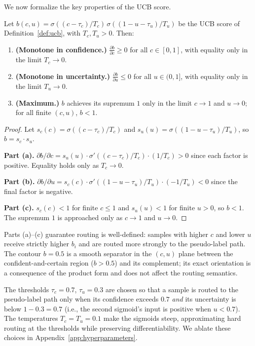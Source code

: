 We now formalize the key properties of the UCB score.

\begin{theorem}
\label{thm:ucb}
Let $b(c,u) = \sigma((c-\tau_c)/T_c)\,\sigma((1-u-\tau_u)/T_u)$ be the UCB score of Definition~\ref{def:ucb}, with $T_c, T_u > 0$. Then:
\begin{enumerate}[label=(\alph*),leftmargin=*,topsep=2pt,itemsep=2pt]
  \item \textbf{(Monotone in confidence.)} $\frac{\partial b}{\partial c} \ge 0$ for all $c \in [0,1]$, with equality only in the limit $T_c \to 0$.
  \item \textbf{(Monotone in uncertainty.)} $\frac{\partial b}{\partial u} \le 0$ for all $u \in (0,1]$, with equality only in the limit $T_u \to 0$.
  \item \textbf{(Maximum.)} $b$ achieves its supremum $1$ only in the limit $c \to 1$ and $u \to 0$; for all finite $(c,u)$, $b < 1$.
\end{enumerate}
\end{theorem}

\begin{proof}
Let $s_c(c) = \sigma((c-\tau_c)/T_c)$ and $s_u(u) = \sigma((1-u-\tau_u)/T_u)$, so $b = s_c \cdot s_u$.

\textbf{Part (a).} $\partial b/\partial c = s_u(u) \cdot \sigma'((c-\tau_c)/T_c) \cdot (1/T_c) > 0$ since each factor is positive. Equality holds only as $T_c \to 0$.

\textbf{Part (b).} $\partial b/\partial u = s_c(c) \cdot \sigma'((1-u-\tau_u)/T_u) \cdot (-1/T_u) < 0$ since the final factor is negative.

\textbf{Part (c).} $s_c(c) < 1$ for finite $c \le 1$ and $s_u(u) < 1$ for finite $u > 0$, so $b < 1$. The supremum $1$ is approached only as $c \to 1$ and $u \to 0$.
\end{proof}

\begin{remark}
Parts (a)--(c) guarantee routing is well-defined: samples with higher $c$ and lower $u$ receive strictly higher $b_i$ and are routed more strongly to the pseudo-label path. The contour $b=0.5$ is a smooth separator in the $(c,u)$ plane between the confident-and-certain region ($b>0.5$) and its complement; its exact orientation is a consequence of the product form and does not affect the routing semantics.
\end{remark}

\begin{remark}
The thresholds $\tau_c=0.7$, $\tau_u=0.3$ are chosen so that a sample is routed to the pseudo-label path only when its confidence exceeds $0.7$ \emph{and} its uncertainty is below $1 - 0.3 = 0.7$ (i.e., the second sigmoid's input is positive when $u < 0.7$). The temperatures $T_c=T_u=0.1$ make the sigmoids steep, approximating hard routing at the thresholds while preserving differentiability. We ablate these choices in Appendix~\ref{app:hyperparameters}.
\end{remark}

